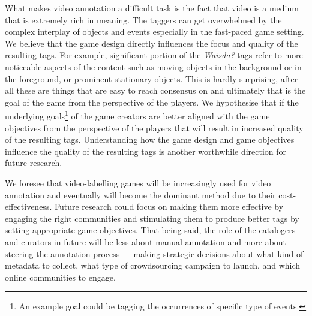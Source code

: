 What makes video annotation a difficult task is the fact that video is a medium that is extremely rich in meaning. The taggers can get overwhelmed by the complex interplay of objects and events especially in the fast-paced game setting. We believe that the game design directly influences the focus and quality of the resulting tags. For example, significant portion of the \textit{Waisda?} tags refer to more noticeable aspects of the content such as moving objects in the background or in the foreground, or prominent stationary objects. This is hardly surprising, after all these are things that are easy to reach consensus on and ultimately that is the goal of the game from the perspective of the players. We hypothesise that if the underlying goals\footnote{An example goal could be tagging the occurrences of specific type of events.} of the game creators are better aligned with the game objectives from the perspective of the players that will result in increased quality of the resulting tags. Understanding how the game design and game objectives influence the quality of the resulting tags is another worthwhile direction for future research. 

We foresee that video-labelling games will be increasingly used for video annotation and eventually will become the dominant method due to their cost-effectiveness. Future research could focus on making them more effective by engaging the right communities and stimulating them to produce better tags by setting appropriate game objectives.   
That being said, the role of the catalogers and curators in future will be less about manual annotation and more about steering the annotation process --- making strategic decisions about what kind of metadata to collect, what   type of crowdsourcing campaign to launch, and which online communities to engage.



 